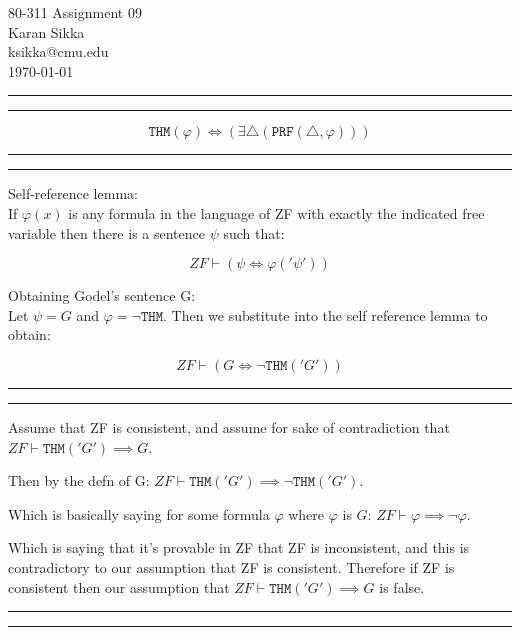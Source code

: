 \documentclass[11pt,letterpaper]{article}
\makeatletter
\newcommand{\question}[1] {\vspace{.25in} \hrule\vspace{0.5em}
\noindent{\bf #1} \vspace{0.5em}
\hrule \vspace{.10in}}
\newcommand{\myname}{Karan Sikka}
\newcommand{\myandrew}{ksikka@cmu.edu}
\newcommand{\myhwnum}{09}
\makeatother
\begin{document}
\medskip

\thispagestyle{plain}
\begin{center}                  %
{\Large 80-311 Assignment \myhwnum} \\
\myname \\
\myandrew \\
\today
\end{center}

\question{1.1}
$$ \mathtt{THM}(\varphi) \iff (\exists \triangle (\mathtt{PRF}(\triangle, \varphi))) $$

\question{1.2}
Self-reference lemma: \\
If $\varphi(x)$ is any formula in the language of ZF
with exactly the indicated free variable then there is a sentence $\psi$
such that:

$$ ZF \vdash (\psi \iff \varphi('\psi')) $$

Obtaining Godel's sentence G: \\
Let $\psi = G$ and $\varphi = \neg \mathtt{THM}$. Then we substitute into the self reference lemma to obtain:

$$ ZF \vdash (G \iff \neg \mathtt{THM}('G')) $$

\question{1.3}
Assume that ZF is consistent, and assume for sake of contradiction that $ZF \vdash \mathtt{THM}('G') \implies G$.

Then by the defn of G:
$ZF \vdash \mathtt{THM}('G') \implies \neg \mathtt{THM}('G')$.

Which is basically saying for some formula $\varphi$ where $\varphi$ is $G$:
$ZF \vdash \varphi \implies \neg \varphi$.

Which is saying that it's provable in ZF that ZF is inconsistent, and this is contradictory to our assumption that ZF is consistent. Therefore
if ZF is consistent then our assumption that $ZF \vdash \mathtt{THM}('G') \implies G$ is false.

\question{2.1}
\end{document}
